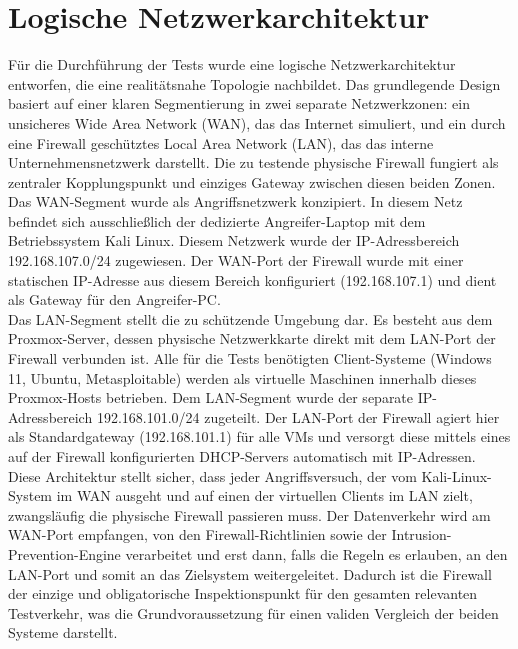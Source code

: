 \section{Logische Netzwerkarchitektur}

Für die Durchführung der Tests wurde eine logische Netzwerkarchitektur entworfen, die eine realitätsnahe Topologie nachbildet. Das grundlegende Design basiert auf einer klaren Segmentierung in zwei separate Netzwerkzonen: ein unsicheres Wide Area Network (WAN), das das Internet simuliert, und ein durch eine Firewall geschütztes Local Area Network (LAN), das das interne Unternehmensnetzwerk darstellt. Die zu testende physische Firewall fungiert als zentraler Kopplungspunkt und einziges Gateway zwischen diesen beiden Zonen.\\

Das WAN-Segment wurde als Angriffsnetzwerk konzipiert. In diesem Netz befindet sich ausschließlich der dedizierte Angreifer-Laptop mit dem Betriebssystem Kali Linux. Diesem Netzwerk wurde der IP-Adressbereich 192.168.107.0/24 zugewiesen. Der WAN-Port der Firewall wurde mit einer statischen IP-Adresse aus diesem Bereich konfiguriert (192.168.107.1) und dient als Gateway für den Angreifer-PC.\\

Das LAN-Segment stellt die zu schützende Umgebung dar. Es besteht aus dem Proxmox-Server, dessen physische Netzwerkkarte direkt mit dem LAN-Port der Firewall verbunden ist. Alle für die Tests benötigten Client-Systeme (Windows 11, Ubuntu, Metasploitable) werden als virtuelle Maschinen innerhalb dieses Proxmox-Hosts betrieben. Dem LAN-Segment wurde der separate IP-Adressbereich 192.168.101.0/24 zugeteilt. Der LAN-Port der Firewall agiert hier als Standardgateway (192.168.101.1) für alle VMs und versorgt diese mittels eines auf der Firewall konfigurierten DHCP-Servers automatisch mit IP-Adressen.\\

Diese Architektur stellt sicher, dass jeder Angriffsversuch, der vom Kali-Linux-System im WAN ausgeht und auf einen der virtuellen Clients im LAN zielt, zwangsläufig die physische Firewall passieren muss. Der Datenverkehr wird am WAN-Port empfangen, von den Firewall-Richtlinien sowie der Intrusion-Prevention-Engine verarbeitet und erst dann, falls die Regeln es erlauben, an den LAN-Port und somit an das Zielsystem weitergeleitet. Dadurch ist die Firewall der einzige und obligatorische Inspektionspunkt für den gesamten relevanten Testverkehr, was die Grundvoraussetzung für einen validen Vergleich der beiden Systeme darstellt.

